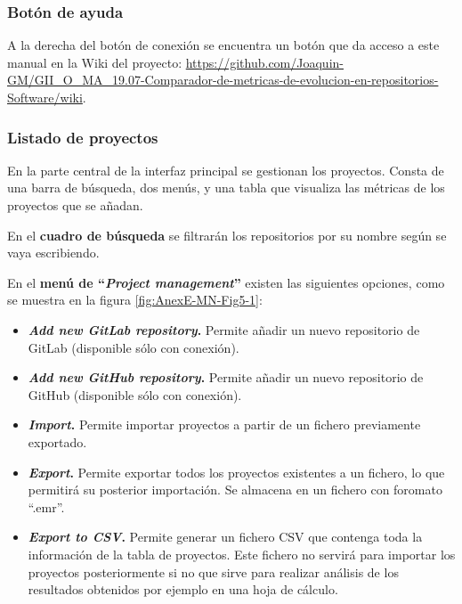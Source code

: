 \newpage
\subsubsection{Botón de ayuda}
A la derecha del botón de conexión se encuentra un botón que da acceso a este manual en la Wiki del proyecto: \url{https://github.com/Joaquin-GM/GII_O_MA_19.07-Comparador-de-metricas-de-evolucion-en-repositorios-Software/wiki}.

\subsubsection{Listado de proyectos}
En la parte central de la interfaz principal se gestionan los proyectos. Consta de una barra de búsqueda, dos menús, y una tabla que visualiza las métricas de los proyectos que se añadan.

En el \textbf{cuadro de búsqueda} se filtrarán los repositorios por su nombre según se vaya escribiendo.

En el \textbf{menú de ``\textit{Project management}''} existen las siguientes opciones, como se muestra en la figura \ref{fig:AnexE-MN-Fig5-1}:
\begin{itemize}
	\item \textbf{\textit{Add new GitLab repository}.} Permite añadir un nuevo repositorio de GitLab (disponible sólo con conexión). 
	
	\item \textbf{\textit{Add new GitHub repository}.} Permite añadir un nuevo repositorio de GitHub (disponible sólo con conexión). 
	
	\item \textbf{\textit{Import}.} Permite importar proyectos a partir de un fichero previamente exportado.
	
	\item \textbf{\textit{Export}.} Permite exportar todos los proyectos existentes a un fichero, lo que permitirá su posterior importación. Se almacena en un fichero con foromato ``.emr''.
	
	\item \textbf{\textit{Export to CSV}.} Permite generar un fichero CSV que contenga toda la información de la tabla de proyectos. Este fichero no servirá para importar los proyectos posteriormente si no que sirve para realizar análisis de los resultados obtenidos por ejemplo en una hoja de cálculo.
\end{itemize}

